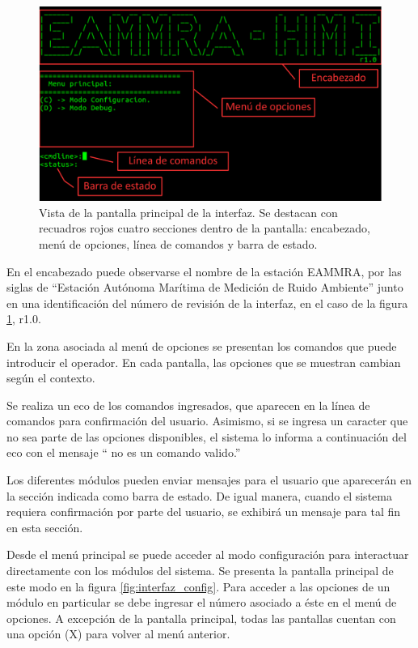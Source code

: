 \begin{figure}[htpb]
	\centering
	\includegraphics[width=\textwidth]{./Figures/interfaz_detalles.pdf}
	\caption[]{Vista de la pantalla principal de la interfaz. Se destacan con recuadros rojos cuatro secciones dentro de la pantalla: encabezado, menú de opciones, línea de comandos y barra de estado.}
	\label{fig:interfaz_main}
\end{figure}

En el encabezado puede observarse el nombre de la estación EAMMRA, por las siglas de ``Estación Autónoma Marítima de Medición de Ruido Ambiente'' junto en una identificación del número de revisión de la interfaz, en el caso de la figura \ref{fig:interfaz_main}, r1.0. 

En la zona asociada al menú de opciones se presentan los comandos que puede introducir el operador. En cada pantalla, las opciones que se muestran cambian según el contexto.

Se realiza un eco de los comandos ingresados, que aparecen en la línea de comandos para confirmación del usuario. Asimismo, si se ingresa un caracter que no sea parte de las opciones disponibles, el sistema lo informa a continuación del eco con el mensaje `` no es un comando valido.'' 

Los diferentes módulos pueden enviar mensajes para el usuario que aparecerán en la sección indicada como barra de estado.  De igual manera, cuando el sistema requiera confirmación por parte del usuario, se exhibirá un mensaje para tal fin en esta sección.

Desde el menú principal se puede acceder al modo configuración para interactuar directamente con los módulos del sistema.  Se presenta la pantalla principal de este modo en la figura \ref{fig:interfaz_config}.  Para acceder a las opciones de un módulo en particular se debe ingresar el número asociado a éste en el menú de opciones.  A excepción de la pantalla principal, todas las pantallas cuentan con una opción (X) para volver al menú anterior.

